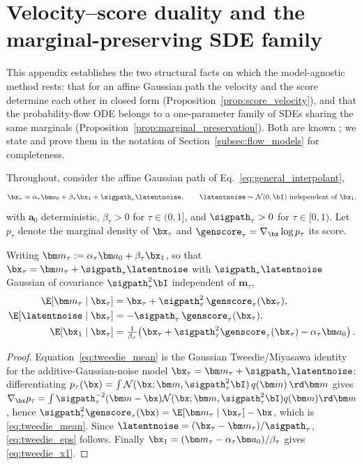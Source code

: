 \section{Velocity--score duality and the marginal-preserving SDE family}
\label{appendix:score_velocity}

This appendix establishes the two structural facts on which the model-agnostic method rests: that for an affine Gaussian path the velocity and the score determine each other in closed form (Proposition~\ref{prop:score_velocity}), and that the probability-flow ODE belongs to a one-parameter family of SDEs sharing the same marginals (Proposition~\ref{prop:marginal_preservation}). Both are known \cite{albergo_stochastic_2023, song_score-based_2021, ma_sit_2024}; we state and prove them in the notation of Section~\ref{subsec:flow_models} for completeness.

Throughout, consider the affine Gaussian path of Eq.~\eqref{eq:general_interpolant},
\begin{align}\label{eq:app_path}
    \bx_\tau = \alpha_\tau\bm a_0 + \beta_\tau\bx_1 + \sigpath_\tau\latentnoise,
    \qquad \latentnoise\sim\mathcal{N}(0,\bI)\ \text{independent of}\ \bx_1,
\end{align}
with $\bm a_0$ deterministic, $\beta_\tau>0$ for $\tau\in(0,1]$, and $\sigpath_\tau>0$ for $\tau\in[0,1)$. Let $p_\tau$ denote the marginal density of $\bx_\tau$ and $\genscore_\tau=\nabla_{\bx}\log p_\tau$ its score.

\begin{lemma}\label{lem:tweedie}
Writing $\bm m_\tau := \alpha_\tau\bm a_0 + \beta_\tau\bx_1$, so that $\bx_\tau = \bm m_\tau + \sigpath_\tau\latentnoise$ with $\sigpath_\tau\latentnoise$ Gaussian of covariance $\sigpath_\tau^2\bI$ independent of $\bm m_\tau$,
\begin{align}
    \E[\bm m_\tau \mid \bx_\tau] &= \bx_\tau + \sigpath_\tau^2\,\genscore_\tau(\bx_\tau), \label{eq:tweedie_mean}\\
    \E[\latentnoise \mid \bx_\tau] &= -\sigpath_\tau\,\genscore_\tau(\bx_\tau), \label{eq:tweedie_eps}\\
    \E[\bx_1 \mid \bx_\tau] &= \tfrac{1}{\beta_\tau}\!\left(\bx_\tau + \sigpath_\tau^2\genscore_\tau(\bx_\tau) - \alpha_\tau\bm a_0\right). \label{eq:tweedie_x1}
\end{align}
\end{lemma}
\begin{proof}
Equation~\eqref{eq:tweedie_mean} is the Gaussian Tweedie/Miyasawa identity for the additive-Gaussian-noise model $\bx_\tau = \bm m_\tau + \sigpath_\tau\latentnoise$: differentiating $p_\tau(\bx)=\int \mathcal{N}(\bx;\bm m,\sigpath_\tau^2\bI)\,q(\bm m)\,\rd\bm m$ gives $\nabla_{\bx} p_\tau = \int \sigpath_\tau^{-2}(\bm m-\bx)\mathcal{N}(\bx;\bm m,\sigpath_\tau^2\bI)q(\bm m)\rd\bm m$, hence $\sigpath_\tau^2\genscore_\tau(\bx) = \E[\bm m_\tau\mid\bx_\tau]-\bx$, which is \eqref{eq:tweedie_mean}. Since $\latentnoise=(\bx_\tau-\bm m_\tau)/\sigpath_\tau$, \eqref{eq:tweedie_eps} follows. Finally $\bx_1=(\bm m_\tau-\alpha_\tau\bm a_0)/\beta_\tau$ gives \eqref{eq:tweedie_x1}.
\end{proof}

